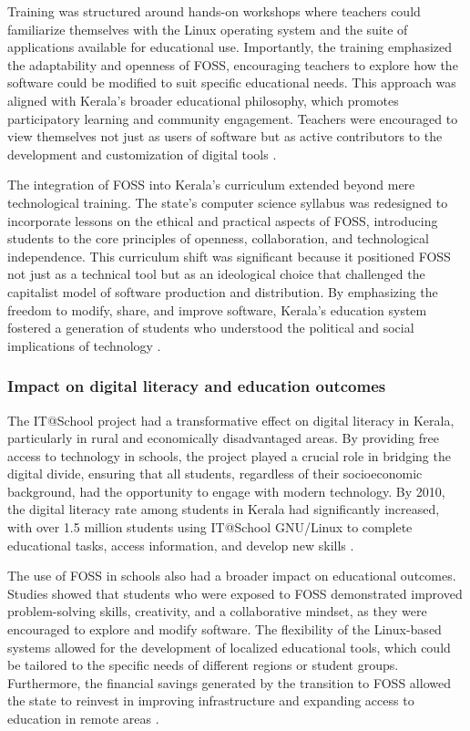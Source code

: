 \begin{refsection}
Training was structured around hands-on workshops where teachers could familiarize themselves with the Linux operating system and the suite of applications available for educational use. Importantly, the training emphasized the adaptability and openness of FOSS, encouraging teachers to explore how the software could be modified to suit specific educational needs. This approach was aligned with Kerala’s broader educational philosophy, which promotes participatory learning and community engagement. Teachers were encouraged to view themselves not just as users of software but as active contributors to the development and customization of digital tools \cite[pp.~16-17]{prabhakar2010itschool}.

The integration of FOSS into Kerala’s curriculum extended beyond mere technological training. The state's computer science syllabus was redesigned to incorporate lessons on the ethical and practical aspects of FOSS, introducing students to the core principles of openness, collaboration, and technological independence. This curriculum shift was significant because it positioned FOSS not just as a technical tool but as an ideological choice that challenged the capitalist model of software production and distribution. By emphasizing the freedom to modify, share, and improve software, Kerala’s education system fostered a generation of students who understood the political and social implications of technology \cite[pp.~11-13]{palackal2007information}.

\subsubsection{Impact on digital literacy and education outcomes}

The IT@School project had a transformative effect on digital literacy in Kerala, particularly in rural and economically disadvantaged areas. By providing free access to technology in schools, the project played a crucial role in bridging the digital divide, ensuring that all students, regardless of their socioeconomic background, had the opportunity to engage with modern technology. By 2010, the digital literacy rate among students in Kerala had significantly increased, with over 1.5 million students using IT@School GNU/Linux to complete educational tasks, access information, and develop new skills \cite[pp.~10-12]{prabhakar2010itschool}.

The use of FOSS in schools also had a broader impact on educational outcomes. Studies showed that students who were exposed to FOSS demonstrated improved problem-solving skills, creativity, and a collaborative mindset, as they were encouraged to explore and modify software. The flexibility of the Linux-based systems allowed for the development of localized educational tools, which could be tailored to the specific needs of different regions or student groups. Furthermore, the financial savings generated by the transition to FOSS allowed the state to reinvest in improving infrastructure and expanding access to education in remote areas \cite[pp.~23-24]{kurup2020freedom}.


\end{refsection}
